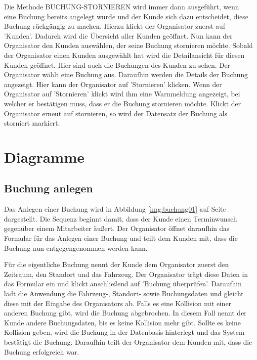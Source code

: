 
Die Methode BUCHUNG-STORNIEREN wird immer dann ausgeführt, wenn eine Buchung bereits angelegt wurde und der Kunde sich dazu entscheidet, diese Buchung rückgängig zu machen. Hierzu klickt der Organisator zuerst auf 'Kunden'. Dadurch wird die Übersicht aller Kunden geöffnet. Nun kann der Organisator den Kunden auswählen, der seine Buchung stornieren möchte. Sobald der Organisator einen Kunden ausgewählt hat wird die Detailansicht für diesen Kunden geöffnet. Hier sind auch die Buchungen des Kunden zu sehen. Der Organisator wählt eine Buchung aus. Daraufhin werden die Details der Buchung angezeigt. Hier kann der Organisator auf 'Stornieren' klicken. Wenn der Organisator auf 'Stornieren' klickt wird ihm eine Warnmeldung angezeigt, bei welcher er bestätigen muss, dass er die Buchung stornieren möchte. Klickt der Organisator erneut auf stornieren, so wird der Datensatz der Buchung als storniert markiert.


\newpage

\section{Diagramme}

\subsection{Buchung anlegen}


Das Anlegen einer Buchung wird in Abbildung \ref{img:buchung01} auf Seite \pageref{img:buchung01} dargestellt. Die Sequenz beginnt damit, dass der Kunde einen Terminwunsch gegenüber einem Mitarbeiter äußert. Der Organisator öffnet daraufhin das Formular für das Anlegen einer Buchung und teilt dem Kunden mit, dass die Buchung nun entgegengenommen werden kann.

Für die eigentliche Buchung nennt der Kunde dem Organisator zuerst den Zeitraum, den Standort und das Fahrzeug. Der Organisator trägt diese Daten in das Formular ein und klickt anschließend auf 'Buchung überprüfen'. Daraufhin lädt die Anwendung die Fahrzeug-, Standort- sowie Buchungsdaten und gleicht diese mit der Eingabe des Organisators ab. Falls es eine Kollision mit einer anderen Buchung gibt, wird die Buchung abgebrochen. In diesem Fall nennt der Kunde andere Buchungsdaten, bis es keine Kollision mehr gibt. Sollte es keine Kollision geben, wird die Buchung in der Datenbasis hinterlegt und das System bestätigt die Buchung. Daraufhin teilt der Organisator dem Kunden mit, dass die Buchung erfolgreich war.

